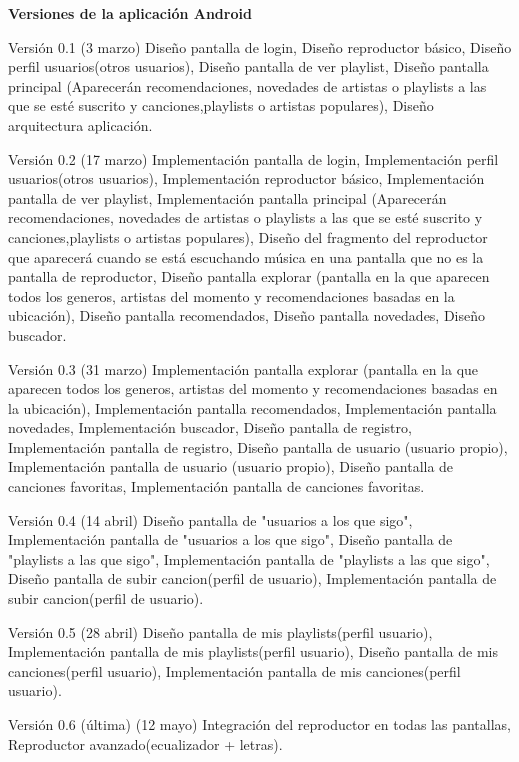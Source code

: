 \documentclass[12pt]{article}%
\begin{document}
\textbf{Versiones de la aplicaci\'on Android}

Versi\'on 0.1 (3 marzo)
Dise\~no pantalla de login,
Dise\~no reproductor b\'asico,
Dise\~no perfil usuarios(otros usuarios),
Dise\~no pantalla de ver playlist,
Dise\~no pantalla principal (Aparecer\'an recomendaciones, novedades de artistas o playlists a las que se est\'e suscrito y canciones,playlists o artistas populares),
Dise\~no arquitectura aplicaci\'on.

Versi\'on 0.2 (17 marzo)
Implementaci\'on pantalla de login,
Implementaci\'on perfil usuarios(otros usuarios),
Implementaci\'on reproductor b\'asico,
Implementaci\'on pantalla de ver playlist,
Implementaci\'on pantalla principal (Aparecer\'an recomendaciones, novedades de artistas o playlists a las que se est\'e suscrito y canciones,playlists o artistas populares),
Dise\~no del fragmento del reproductor que aparecer\'a cuando se est\'a escuchando m\'usica en una pantalla que no es la pantalla de reproductor,
Dise\~no pantalla explorar (pantalla en la que aparecen todos los generos, artistas del momento y recomendaciones basadas en la ubicaci\'on),
Dise\~no pantalla recomendados,
Dise\~no pantalla novedades,
Dise\~no buscador.

Versi\'on 0.3 (31 marzo)
Implementaci\'on pantalla explorar (pantalla en la que aparecen todos los generos, artistas del momento y recomendaciones basadas en la ubicaci\'on),
Implementaci\'on pantalla recomendados,
Implementaci\'on pantalla novedades,
Implementaci\'on buscador,
Dise\~no pantalla de registro,
Implementaci\'on pantalla de registro,
Dise\~no pantalla de usuario (usuario propio),
Implementaci\'on pantalla de usuario (usuario propio),
Dise\~no pantalla de canciones favoritas,
Implementaci\'on pantalla de canciones favoritas.

Versi\'on 0.4 (14 abril)
Dise\~no pantalla de "usuarios a los que sigo",
Implementaci\'on pantalla de "usuarios a los que sigo",
Dise\~no pantalla de "playlists a las que sigo",
Implementaci\'on pantalla de "playlists a las que sigo",
Dise\~no pantalla de subir cancion(perfil de usuario),
Implementaci\'on pantalla de subir cancion(perfil de usuario).

Versi\'on 0.5 (28 abril)
Dise\~no pantalla de mis playlists(perfil usuario),
Implementaci\'on pantalla de mis playlists(perfil usuario),
Dise\~no pantalla de mis canciones(perfil usuario),
Implementaci\'on pantalla de mis canciones(perfil usuario).

Versi\'on 0.6 (\'ultima) (12 mayo)
Integraci\'on del reproductor en todas las pantallas,
Reproductor avanzado(ecualizador + letras).
\end{document}
